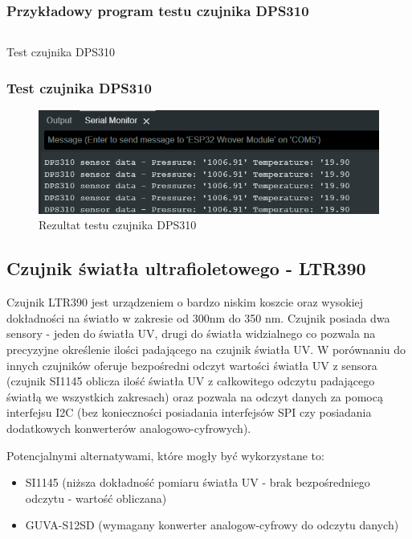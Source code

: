 \documentclass[12pt,a4paper]{article}
\begin{document}
\subsubsection{Przykładowy program testu czujnika DPS310}

\begin{code}[H]
\inputminted[frame=lines,baselinestretch=1,breaklines,linenos,xleftmargin=1.5em]{c}{../proj/dps310-test/dps310-test.ino}

\caption{Test czujnika DPS310}
\end{code}

\subsubsection{Test czujnika DPS310}
\begin{figure}[H]
    \centering
    \includegraphics[width=\textwidth]{dps310-test.png}
    \caption{Rezultat testu czujnika DPS310}
\end{figure}

\subsection{Czujnik światła ultrafioletowego - LTR390}

Czujnik LTR390 jest urządzeniem o bardzo niskim koszcie oraz wysokiej dokładności na światło w zakresie od 300nm do 350 nm. Czujnik posiada dwa sensory - jeden do światła UV, drugi do światła widzialnego co pozwala na precyzyjne określenie ilości padającego na czujnik światła UV. W porównaniu do innych czujników oferuje bezpośredni odczyt wartości światła UV z sensora (czujnik SI1145 oblicza ilość światła UV z całkowitego odczytu padającego światłą we wszystkich zakresach) oraz pozwala na odczyt danych za pomocą interfejsu I2C (bez konieczności posiadania interfejsów SPI czy posiadania dodatkowych konwerterów analogowo-cyfrowych).

Potencjalnymi alternatywami, które mogły być wykorzystane to:
\begin{itemize}
    \item SI1145 (niższa dokładność pomiaru światła UV - brak bezpośredniego odczytu - wartość obliczana)
    \item GUVA-S12SD (wymagany konwerter analogow-cyfrowy do odczytu danych)
\end{itemize}
\end{document}
